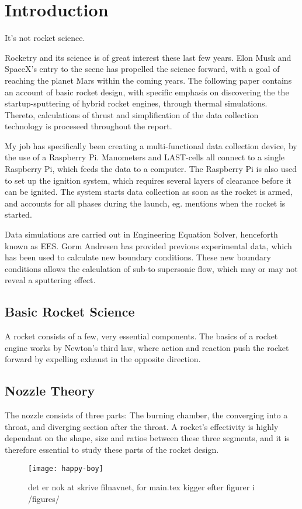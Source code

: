 \chapter{Introduction}

It's not rocket science.

Rocketry and its science is of great interest these last few years. Elon Musk and SpaceX's entry to the scene has propelled the science forward, with a goal of reaching the planet Mars within the coming years. The following paper contains an account of basic rocket design, with specific emphasis on discovering the the startup-sputtering of hybrid rocket engines, through thermal simulations. Thereto, calculations of thrust and simplification of the data collection technology is proceseed throughout the report.

My job has specifically been creating a multi-functional data collection device, by the use of a Raspberry Pi. Manometers and LAST-cells all connect to a single Raspberry Pi, which feeds the data to a computer. The Raspberry Pi is also used to set up the ignition system, which requires several layers of clearance before it can be ignited. The system starts data collection as soon as the rocket is armed, and accounts for all phases during the launch, eg. mentions when the rocket is started.

Data simulations are carried out in Engineering Equation Solver, henceforth known as EES. Gorm Andresen has provided previous experimental data, which has been used to calculate new boundary conditions. These new boundary conditions allows the calculation of sub-to supersonic flow, which may or may not reveal a sputtering effect.

\section{Basic Rocket Science}

A rocket consists of a few, very essential components. The basics of a rocket engine works by Newton's third law, where action and reaction push the rocket forward by expelling exhaust in the opposite direction.

\section{Nozzle Theory}

The nozzle consists of three parts: The burning chamber, the converging into a throat, and diverging section after the throat. A rocket's effectivity is highly dependant on the shape, size and ratios between these three segments, and it is therefore essential to study these parts of the rocket design.






\begin{figure}
\texttt{[image: happy-boy]}
\caption{det er nok at skrive filnavnet, for main.tex kigger efter figurer i /figures/}
\label{fig:yyy}
\end{figure}

